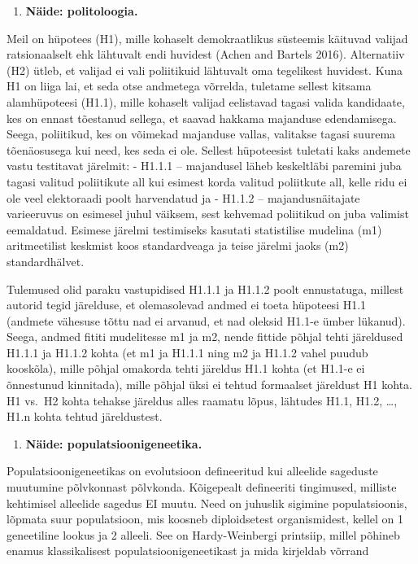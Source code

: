 \documentclass[]{book}
\providecommand{\tightlist}{%
  \setlength{\itemsep}{0pt}\setlength{\parskip}{0pt}}
\begin{document}
\begin{enumerate}
\def\labelenumi{(\arabic{enumi})}
\tightlist
\item
  \textbf{Näide: politoloogia.}
\end{enumerate}

Meil on hüpotees (H1), mille kohaselt demokraatlikus süsteemis käituvad valijad ratsionaalselt ehk lähtuvalt endi huvidest (Achen and Bartels 2016).
Alternatiiv (H2) ütleb, et valijad ei vali poliitikuid lähtuvalt oma tegelikest huvidest.
Kuna H1 on liiga lai, et seda otse andmetega võrrelda, tuletame sellest kitsama alamhüpoteesi (H1.1), mille kohaselt valijad eelistavad tagasi valida kandidaate, kes on ennast tõestanud sellega, et saavad hakkama majanduse edendamisega.
Seega, poliitikud, kes on võimekad majanduse vallas, valitakse tagasi suurema tõenäosusega kui need, kes seda ei ole.
Sellest hüpoteesist tuletati kaks andemete vastu testitavat järelmit:
- H1.1.1 -- majandusel läheb keskeltläbi paremini juba tagasi valitud poliitikute all kui esimest korda valitud poliitkute all, kelle ridu ei ole veel elektoraadi poolt harvendatud ja
- H1.1.2 -- majandusnäitajate varieeruvus on esimesel juhul väiksem, sest kehvemad poliitikud on juba valimist eemaldatud.
Esimese järelmi testimiseks kasutati statistilise mudelina (m1) aritmeetilist keskmist koos standardveaga ja teise järelmi jaoks (m2) standardhälvet.

Tulemused olid paraku vastupidised H1.1.1 ja H1.1.2 poolt ennustatuga, millest autorid tegid järelduse, et olemasolevad andmed ei toeta hüpoteesi H1.1 (andmete vähesuse tõttu nad ei arvanud, et nad oleksid H1.1-e ümber lükanud).
Seega, andmed fititi mudelitesse m1 ja m2, nende fittide põhjal tehti järeldused H1.1.1 ja H1.1.2 kohta (et m1 ja H1.1.1 ning m2 ja H1.1.2 vahel puudub kooskõla), mille põhjal omakorda tehti järeldus H1.1 kohta (et H1.1-e ei õnnestunud kinnitada), mille põhjal üksi ei tehtud formaalset järeldust H1 kohta.
H1 vs.~H2 kohta tehakse järeldus alles raamatu lõpus, lähtudes H1.1, H1.2, \ldots{}, H1.n kohta tehtud järeldustest.

\begin{enumerate}
\def\labelenumi{(\arabic{enumi})}
\setcounter{enumi}{1}
\tightlist
\item
  \textbf{Näide: populatsioonigeneetika.}
\end{enumerate}

Populatsioonigeneetikas on evolutsioon defineeritud kui alleelide sageduste muutumine põlvkonnast põlvkonda. Kõigepealt defineeriti tingimused, milliste kehtimisel alleelide sagedus EI muutu. Need on juhuslik sigimine populatsioonis, lõpmata suur populatsioon, mis koosneb diploidsetest organismidest, kellel on 1 geneetiline lookus ja 2 alleeli. See on Hardy-Weinbergi printsiip, millel põhineb enamus klassikalisest populatsioonigeneetikast ja mida kirjeldab võrrand
\end{document}
